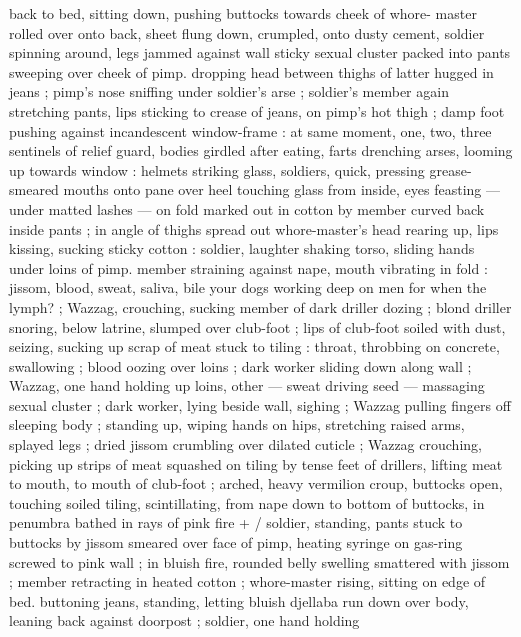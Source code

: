 back to bed, sitting down, pushing buttocks towards cheek of whore- 
master rolled over onto back, sheet flung down, crumpled, onto 
dusty cement, soldier spinning around, legs jammed against wall 
sticky sexual cluster packed into pants sweeping over cheek of pimp. 
dropping head between thighs of latter hugged in jeans ; pimp's 
nose sniffing under soldier's arse ; soldier's member again 
stretching pants, lips sticking to crease of jeans, on pimp's hot thigh 
; damp foot pushing against incandescent window-frame : at same 
moment, one, two, three sentinels of relief guard, bodies girdled 
after eating, farts drenching arses, looming up towards window : 
helmets striking glass, soldiers, quick, pressing grease-smeared 
mouths onto pane over heel touching glass from inside, eyes 
feasting --- under matted lashes --- on fold marked out in cotton by 
member curved back inside pants ; in angle of thighs spread out 
whore-master's head rearing up, lips kissing, sucking sticky cotton : 
soldier, laughter shaking torso, sliding hands under loins of pimp. 
member straining against nape, mouth vibrating in fold : {\thd} {\gl} jissom, 
blood, sweat, saliva, bile{\td} your dogs working deep on men{\thd} for 
when the lymph?{\td} {\gr} ; Wazzag, crouching, sucking member of dark 
driller dozing ; blond driller snoring, below latrine, slumped over 
club-foot ; lips of club-foot soiled with dust, seizing, sucking up 
scrap of meat stuck to tiling : throat, throbbing on concrete, 
swallowing ; blood oozing over loins ; dark worker sliding down along 
wall ; Wazzag, one hand holding up loins, other --- sweat driving 
seed --- massaging sexual cluster ; dark worker, lying beside wall, 
sighing ; Wazzag pulling fingers off sleeping body ; standing up, 
wiping hands on hips, stretching raised arms, splayed legs ; dried 
jissom crumbling over dilated cuticle ; Wazzag crouching, picking up 
strips of meat squashed on tiling by tense feet of drillers, lifting 
meat to mouth, to mouth of club-foot ; arched, heavy vermilion 
croup, buttocks open, touching soiled tiling, scintillating, from nape 
down to bottom of buttocks, in penumbra bathed in rays of pink fire 
+ {\slash} soldier, standing, pants stuck to buttocks by jissom smeared over 
face of pimp, heating syringe on gas-ring screwed to pink wall ; in 
bluish fire, rounded belly swelling smattered with jissom ; member 
retracting in heated cotton ; whore-master rising, sitting on edge of 
bed. buttoning jeans, standing, letting bluish djellaba run down over 
body, leaning back against doorpost ; soldier, one hand holding 
